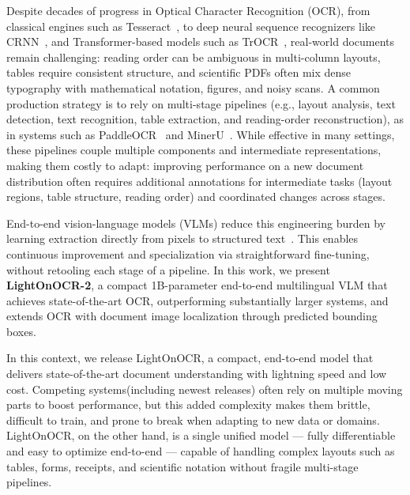 \documentclass{article}
\begin{document}
Despite decades of progress in Optical Character Recognition (OCR), from classical engines such as Tesseract~\cite{smith2007tesseract}, to deep neural sequence recognizers like CRNN~\cite{shi2015crnn}, and Transformer-based models such as TrOCR~\cite{li2021trocr}, real-world documents remain challenging: reading order can be ambiguous in multi-column layouts, tables require consistent structure, and scientific PDFs often mix dense typography with mathematical notation, figures, and noisy scans. A common production strategy is to rely on multi-stage pipelines (e.g., layout analysis, text detection, text recognition, table extraction, and reading-order reconstruction), as in systems such as PaddleOCR~\cite{paddleocr_repo,du2020ppocr} and MinerU~\cite{mineru2024}. While effective in many settings, these pipelines couple multiple components and intermediate representations, making them costly to adapt: improving performance on a new document distribution often requires additional annotations for intermediate tasks (layout regions, table structure, reading order) and coordinated changes across stages.

End-to-end vision-language models (VLMs) reduce this engineering burden by learning extraction directly from pixels to structured text~\cite{Nougat,poznanski2025olmocr,poznanski2025olmocr2,li2025dotsocr,cui2025paddleocrvl,chandra_repo}. This enables continuous improvement and specialization via straightforward fine-tuning, without retooling each stage of a pipeline. In this work, we present \textbf{LightOnOCR-2}, a compact 1B-parameter end-to-end multilingual VLM that achieves state-of-the-art OCR, outperforming substantially larger systems, and extends OCR with document image localization through predicted bounding boxes.

In this context, we release LightOnOCR, a compact, end-to-end model that delivers state-of-the-art document understanding with lightning speed and low cost. Competing systems(including newest releases) often rely on multiple moving parts to boost performance, but this added complexity makes them brittle, difficult to train, and prone to break when adapting to new data or domains. LightOnOCR, on the other hand, is a single unified model — fully differentiable and easy to optimize end-to-end — capable of handling complex layouts such as tables, forms, receipts, and scientific notation without fragile multi-stage pipelines.
\end{document}
